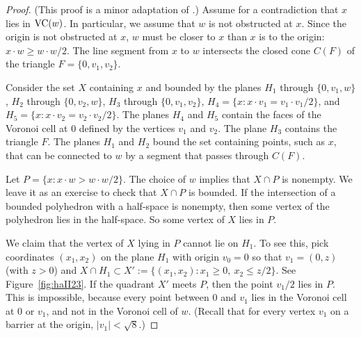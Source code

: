 \begin{proof}
%
%
%
(This proof is a minor adaptation of \cite[Lemma~2.2]{part2}.)
Assume for a contradiction that $x$ lies in ${\operatorname{VC}}(w)$. In
particular, we assume that $w$ is not obstructed at $x$.  Since
the origin is not obstructed at $x$, $w$ must be closer to $x$
than $x$ is to the origin:
    $x\cdot w \ge w\cdot w/2$.
The line segment from $x$ to $w$ intersects the closed cone $C(F)$
of the triangle $F=\{0,v_1,v_2\}$.

Consider the set $X$ containing $x$ and bounded by the planes
$H_1$ through $\{0,v_1,w\}$, $H_2$ through $\{0,v_2,w\}$,  $H_3$
through $\{0,v_1,v_2\}$, $H_4 = \{x: x\cdot v_1 = v_1\cdot
v_1/2\}$, and $H_5 = \{x: x\cdot v_2 = v_2\cdot v_2/2\}$.  The
planes $H_4$ and $H_5$ contain the faces of the Voronoi cell at
$0$ defined by the vertices $v_1$ and $v_2$.  The plane $H_3$
contains the triangle $F$. The planes $H_1$ and $H_2$ bound the
set containing points, such as $x$, that can be connected to $w$
by a segment that passes through $C(F)$.

Let $P = \{x: x\cdot w> w\cdot w/2\}$. The choice of $w$ implies that
$X\cap P$ is nonempty. We leave it as an exercise to check that $X\cap
P$ is bounded.  If the intersection of a bounded polyhedron with a
half-space is nonempty, then some vertex of the polyhedron lies in the
half-space.  So some vertex of $X$ lies in $P$.

We claim that the vertex of $X$ lying in $P$ cannot lie on $H_1$. To see
this, pick coordinates $(x_1,x_2)$ on the plane $H_1$ with origin
$v_0=0$ so that $v_1 = (0,z)$ (with $z>0$)
 and $X\cap H_1\subset X':=\{(x_1,x_2) : x_1\ge 0, \ x_2\le z/2\}$.
See Figure~\ref{fig:haII23}.  If the quadrant $X'$ meets $P$, then
the point $v_1/2$ lies in $P$. This is impossible, because every
point between $0$ and $v_1$ lies in the Voronoi cell at $0$ or
$v_1$, and not in the Voronoi cell of $w$. (Recall that for every
vertex $v_1$ on a barrier at the origin, $|v_1|<\sqrt8$.)


\end{proof}
